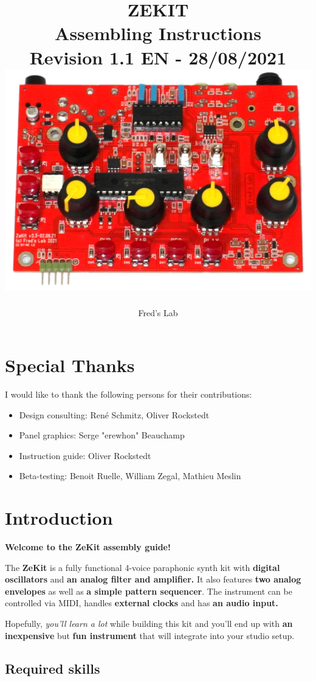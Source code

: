 \documentclass{scrartcl}
\title{
    \vspace*{4cm}
    \huge{ZEKIT} \\
    Assembling Instructions \\
    \vspace*{0.25cm}
    \small{Revision 1.1 EN - 28/08/2021} \\
    \vspace*{0.5cm}
    \includegraphics[scale=0.2]{assets/zekit-assembled.jpg}
}
\author{Fred's Lab}
\begin{document}
\maketitle

\pagebreak


\tableofcontents
\pagebreak


\section{Special Thanks}

I would like to thank the following persons for their contributions:

\begin{itemize}
    \item Design consulting: René Schmitz, Oliver Rockstedt
    \item Panel graphics: Serge "erewhon" Beauchamp 
    \item Instruction guide: Oliver Rockstedt
    \item Beta-testing: Benoit Ruelle, William Zegal, Mathieu Meslin
\end{itemize}


\section{Introduction}

\textbf{Welcome to the ZeKit assembly guide!}

The \textbf{ZeKit} is a fully functional 4-voice paraphonic synth kit with \textbf{digital oscillators} and \textbf{an analog filter and amplifier.}
It also features \textbf{two analog envelopes} as well as \textbf{a simple pattern sequencer}.
The instrument can be controlled via MIDI, handles \textbf{external clocks} and has \textbf{an audio input.}

Hopefully, \emph{you'll learn a lot} while building this kit and you'll end up with \textbf{an inexpensive} but \textbf{fun instrument} that will integrate into your studio setup.

\subsection{Required skills}
\end{document}
